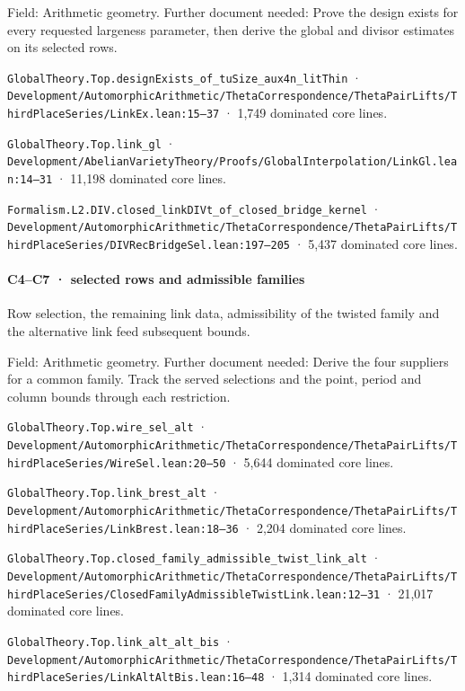 Field: Arithmetic geometry. Further document needed: Prove the design exists for every requested largeness parameter, then derive the global and divisor estimates on its selected rows.

\nolinkurl{GlobalTheory.Top.designExists_of_tuSize_aux4n_litThin} · \nolinkurl{Development/AutomorphicArithmetic/ThetaCorrespondence/ThetaPairLifts/ThirdPlaceSeries/LinkEx.lean:15–37} · 1,749 dominated core lines.

\nolinkurl{GlobalTheory.Top.link_gl} · \nolinkurl{Development/AbelianVarietyTheory/Proofs/GlobalInterpolation/LinkGl.lean:14–31} · 11,198 dominated core lines.

\nolinkurl{Formalism.L2.DIV.closed_linkDIVt_of_closed_bridge_kernel} · \nolinkurl{Development/AutomorphicArithmetic/ThetaCorrespondence/ThetaPairLifts/ThirdPlaceSeries/DIVRecBridgeSel.lean:197–205} · 5,437 dominated core lines.

\paragraph{C4–C7 · selected rows and admissible families}

Row selection, the remaining link data, admissibility of the twisted family and the alternative link feed subsequent bounds.

Field: Arithmetic geometry. Further document needed: Derive the four suppliers for a common family. Track the served selections and the point, period and column bounds through each restriction.

\nolinkurl{GlobalTheory.Top.wire_sel_alt} · \nolinkurl{Development/AutomorphicArithmetic/ThetaCorrespondence/ThetaPairLifts/ThirdPlaceSeries/WireSel.lean:20–50} · 5,644 dominated core lines.

\nolinkurl{GlobalTheory.Top.link_brest_alt} · \nolinkurl{Development/AutomorphicArithmetic/ThetaCorrespondence/ThetaPairLifts/ThirdPlaceSeries/LinkBrest.lean:18–36} · 2,204 dominated core lines.

\nolinkurl{GlobalTheory.Top.closed_family_admissible_twist_link_alt} · \nolinkurl{Development/AutomorphicArithmetic/ThetaCorrespondence/ThetaPairLifts/ThirdPlaceSeries/ClosedFamilyAdmissibleTwistLink.lean:12–31} · 21,017 dominated core lines.

\nolinkurl{GlobalTheory.Top.link_alt_alt_bis} · \nolinkurl{Development/AutomorphicArithmetic/ThetaCorrespondence/ThetaPairLifts/ThirdPlaceSeries/LinkAltAltBis.lean:16–48} · 1,314 dominated core lines.

